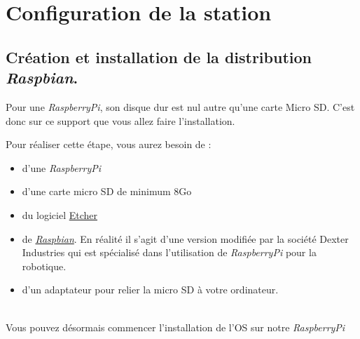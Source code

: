 \chapter{Configuration de la station}

\section{Création et installation de la distribution \textit{Raspbian}.}

Pour une \textit{RaspberryPi}, son disque dur est nul autre qu'une carte Micro SD. C'est donc sur ce support que vous allez faire l'installation.

Pour réaliser cette étape, vous aurez besoin de :
\begin{itemize}
	\item d'une \textit{RaspberryPi}
	\item d'une carte micro SD de minimum 8Go
	\item du logiciel \href{etcher.io}{Etcher}
	\item de \href{https://sourceforge.net/projects/dexterindustriesraspbianflavor/}{\textit{Raspbian}}. En réalité il s'agit d'une version modifiée par la société Dexter Industries qui est spécialisé dans l'utilisation de \textit{RaspberryPi} pour la robotique.
	\item d'un adaptateur pour relier la micro SD à votre ordinateur.
\end{itemize}\\
Vous pouvez désormais commencer l'installation de l'OS sur notre \textit{RaspberryPi}

